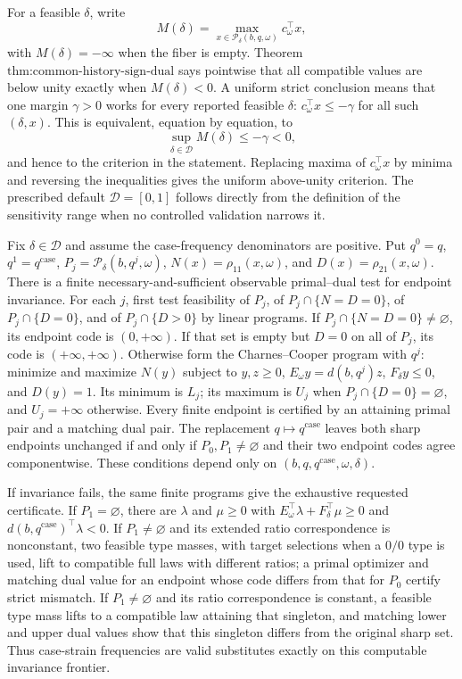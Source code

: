 For a feasible \(\delta\), write
\[
M(\delta)=\max_{x\in\mathcal P_\delta(b,q,\omega)}c_\omega^\top x,
\]
with \(M(\delta)=-\infty\) when the fiber is empty.  Theorem \(\text{thm:common-history-sign-dual}\) says pointwise that all compatible values are below unity exactly when \(M(\delta)<0\).  A uniform strict conclusion means that one margin \(\gamma>0\) works for every reported feasible \(\delta\): \(c_\omega^\top x\leq-\gamma\) for all such \((\delta,x)\).  This is equivalent, equation by equation, to
\[
\sup_{\delta\in\mathcal D}M(\delta)\leq-\gamma<0,
\]
and hence to the criterion in the statement.  Replacing maxima of \(c_\omega^\top x\) by minima and reversing the inequalities gives the uniform above-unity criterion.  The prescribed default \(\mathcal D=[0,1]\) follows directly from the definition of the sensitivity range when no controlled validation narrows it.

Fix \(\delta\in\mathcal D\) and assume the case-frequency denominators are positive.  Put \(q^0=q\), \(q^1=q^{\mathrm{case}}\), \(P_j=\mathcal P_\delta(b,q^j,\omega)\), \(N(x)=\rho_{11}(x,\omega)\), and \(D(x)=\rho_{21}(x,\omega)\).  There is a finite necessary-and-sufficient observable primal--dual test for endpoint invariance.  For each \(j\), first test feasibility of \(P_j\), of \(P_j\cap\{N=D=0\}\), of \(P_j\cap\{D=0\}\), and of \(P_j\cap\{D>0\}\) by linear programs.  If \(P_j\cap\{N=D=0\}\ne\varnothing\), its endpoint code is \((0,+\infty)\).  If that set is empty but \(D=0\) on all of \(P_j\), its code is \((+\infty,+\infty)\).  Otherwise form the Charnes--Cooper program with \(q^j\): minimize and maximize \(N(y)\) subject to \(y,z\geq0\), \(E_\omega y=d(b,q^j)z\), \(F_\delta y\leq0\), and \(D(y)=1\).  Its minimum is \(L_j\); its maximum is \(U_j\) when \(P_j\cap\{D=0\}=\varnothing\), and \(U_j=+\infty\) otherwise.  Every finite endpoint is certified by an attaining primal pair and a matching dual pair.  The replacement \(q\mapsto q^{\mathrm{case}}\) leaves both sharp endpoints unchanged if and only if \(P_0,P_1\ne\varnothing\) and their two endpoint codes agree componentwise.  These conditions depend only on \((b,q,q^{\mathrm{case}},\omega,\delta)\).

If invariance fails, the same finite programs give the exhaustive requested certificate.  If \(P_1=\varnothing\), there are \(\lambda\) and \(\mu\geq0\) with \(E_\omega^\top\lambda+F_\delta^\top\mu\geq0\) and \(d(b,q^{\mathrm{case}})^\top\lambda<0\).  If \(P_1\ne\varnothing\) and its extended ratio correspondence is nonconstant, two feasible type masses, with target selections when a \(0/0\) type is used, lift to compatible full laws with different ratios; a primal optimizer and matching dual value for an endpoint whose code differs from that for \(P_0\) certify strict mismatch.  If \(P_1\ne\varnothing\) and its ratio correspondence is constant, a feasible type mass lifts to a compatible law attaining that singleton, and matching lower and upper dual values show that this singleton differs from the original sharp set.  Thus case-strain frequencies are valid substitutes exactly on this computable invariance frontier.

